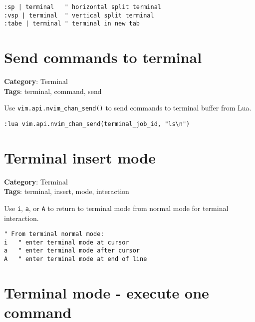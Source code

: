 {{{{{{{{{{{{{{\begin{Exa*}{}
\begin{Verbatim}[fontsize=\footnotesize, breaklines, breakanywhere]
:sp | terminal   " horizontal split terminal
:vsp | terminal  " vertical split terminal  
:tabe | terminal " terminal in new tab
\end{Verbatim}
\end{Exa*}

\section{Send commands to terminal}

\textbf{Category}: Terminal\\ \textbf{Tags}: terminal, command, send
\vspace{0.5cm}

Use {\footnotesize \Verb§vim.api.nvim_chan_send()§} to send commands to terminal buffer from Lua.

\begin{Exa*}{}
\begin{Verbatim}[fontsize=\footnotesize, breaklines, breakanywhere]
:lua vim.api.nvim_chan_send(terminal_job_id, "ls\n")
\end{Verbatim}
\end{Exa*}

\section{Terminal insert mode}

\textbf{Category}: Terminal\\ \textbf{Tags}: terminal, insert, mode, interaction
\vspace{0.5cm}

Use {\footnotesize \Verb§i§}, {\footnotesize \Verb§a§}, or {\footnotesize \Verb§A§} to return to terminal mode from normal mode for terminal interaction.

\begin{Exa*}{}
\begin{Verbatim}[fontsize=\footnotesize, breaklines, breakanywhere]
" From terminal normal mode:
i   " enter terminal mode at cursor
a   " enter terminal mode after cursor  
A   " enter terminal mode at end of line
\end{Verbatim}
\end{Exa*}

\section{Terminal mode - execute one command}

}}}}}}}}}}}}}}
